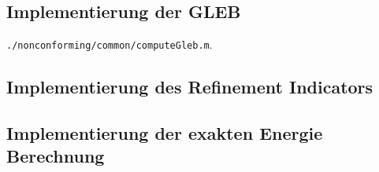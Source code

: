 \subsection{Implementierung der GLEB}
\begin{center}
  \texttt{./nonconforming/common/computeGleb.m}.
\end{center}

\subsection{Implementierung des Refinement Indicators}

\subsection{Implementierung der exakten Energie Berechnung}


